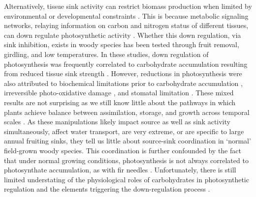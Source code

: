 \documentclass[a4paper]{article}\usepackage[]{graphicx}\usepackage[]{color}
\begin{document}
Alternatively, tissue sink activity can restrict biomass production when limited by environmental or developmental constraints \citep{korner2003carbon}. This is because metabolic signaling networks, relaying information on carbon and nitrogen status of different tissues, can down regulate photosynthetic activity \citep{paul2001sink}.  Whether this down regulation, via sink inhibition, exists in woody species has been tested through fruit removal, girdling, and low temperatures. In these studies, down regulation of photosynthesis was frequently correlated to carbohydrate accumulation resulting from reduced tissue sink strength \citep{iglesias2002regulation,hoch2002altitudinal,urban2007girdling, haouari2013fruit}. However, reductions in photosynthesis were also attributed to biochemical limitations prior to carbohydrate accumulation \citep{nebauer2011photosynthesis}, irreversible photo-oxidative damage \citep{duan2008photosynthetic}, and stomatal limitation \citep{li2005photosynthesis}. These mixed results are not surprising as we still know little about the pathways in which plants achieve balance between assimilation, storage, and growth across temporal scales \citep{smith2007coordination}. As these manipulations likely impact source as well as sink activity simultaneously, affect water transport, are very extreme, or are specific to large annual fruiting sinks, they tell us little about source-sink coordination in ‘normal’ field-grown woody species. This coordination is further confounded by the fact that under normal growing conditions, photosynthesis is not always correlated to photosynthate accumulation, as with fir needles \citep{little1973effect}. Unfortunately, there is still limited understating of the physiological roles of carbohydrates in photosynthetic regulation and the elements triggering the down-regulation process \citep{nebauer2011photosynthesis}. 
\end{document}
